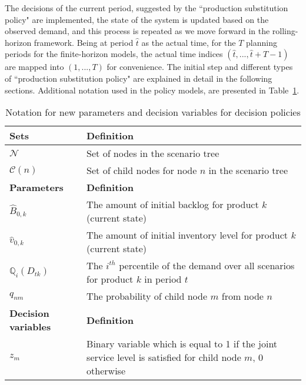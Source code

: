 \documentclass[10pt]{article}
\newcommand{\ti}{t} %
\newcommand{\TI}{\mathcal{T}}
\newcommand{\Ti}{T}
\newcommand{\ka}{k} %
\newcommand{\cn}{\mathcal{C}(n) }
\newcommand{\tAct}{\hat{\ti}} %
\newcommand{\cred}{\color{red!65!black}}
\begin{document}
The decisions of the current period, suggested by the ``production substitution policy" are implemented, the state of the system is updated based on the observed demand, and this process is repeated as we move forward in the rolling-horizon framework.
{\cred Being at period $\tAct$ as the actual time, for the $\Ti$ planning periods for the finite-horizon models, the actual time indices $(\tAct, ..., \tAct +\Ti -1) $ are mapped into $(1, ..., \Ti)$ for convenience.}
The initial step and different types of  ``production substitution  policy" are explained in detail in the following sections. 
Additional notation used in the policy models, are presented in Table~\ref{tab:Sub_Policy_parameters}. 

\begin{table}[H]
\centering
\caption{Notation for new parameters and decision variables for decision policies}
\begin{adjustbox}{width=1\textwidth,center=\textwidth}
\begin{tabular}{ll}
\toprule
{\textbf {Sets}} & {\textbf {Definition}} \\ \midrule
$ \mathcal{N} $  & Set of nodes in the scenario tree \\
$ \cn $  & Set of child nodes for node $n$ in the scenario tree \\
\midrule 
{\bf Parameters} & {\bf Definition} \\ \midrule
$\hat{B}_{0, \ka}$  & The amount of initial backlog for product $\ka$ (current state)\\
$\hat{v}_{0, \ka}$  & The amount of initial inventory level for product $\ka$ (current state) \\
$\mathbb{Q}_{i}({D}_{\ti \ka})$& The $i^{th}$ percentile of the demand over all scenarios for product $\ka$ in period $\ti$\\
$q_{nm} $&  The probability of child node $m$ from node $n$  \\
\midrule
{\bf Decision variables} & {\bf Definition} \\ \midrule
$z_{m}$ & Binary variable which is equal to 1 if the joint service level is satisfied for child node $m$, 0 otherwise \\ 
\bottomrule
\end{tabular}
\end{adjustbox}
 \label{tab:Sub_Policy_parameters}
\end{table}
\end{document}
